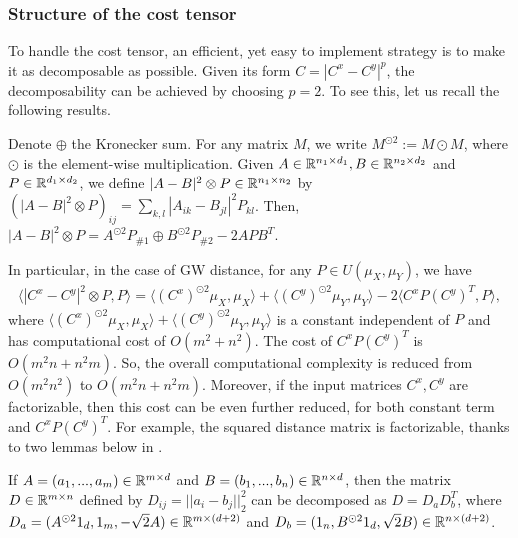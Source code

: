 \subsubsection{Structure of the cost tensor}
To handle the cost tensor, an efficient, yet easy to implement strategy is to make it
as decomposable as possible. Given its form $C = |C^x - C^y|^p$, the decomposability
can be achieved by choosing $p=2$. To see this, let us recall the following results.
\begin{lemma}
  \label{lemma_peyre16}
Denote $\oplus$ the Kronecker sum.
For any matrix $M$, we write $M^{\odot 2} := M \odot M$, where $\odot$
is the element-wise multiplication. Given $A \in \mathbb R^{n_1 \times d_1},
B \in \mathbb R^{n_2 \times d_2}$ and $P \in \mathbb R^{d_1 \times d_2}$, we define
$\vert A - B \vert^2 \otimes P \in \mathbb R^{n_1 \times n_2}$ by
$(\vert A - B \vert^2 \otimes P)_{ij} = \sum_{k,l } |A_{ik} - B_{jl}|^2 P_{kl}$.
Then, $\vert A - B \vert^2 \otimes P = A^{\odot 2} P_{\# 1} \oplus B^{\odot 2} P_{\# 2} - 2 A P B^T$.
\end{lemma}
In particular, in the case of GW distance, for any $P \in U(\mu_X, \mu_Y)$, we have
\begin{align}
  \label{eq:cost_tensor_full}
  \langle |C^x - C^y|^2 \otimes P, P \rangle
  = \langle (C^x)^{\odot 2} \mu_X, \mu_X \rangle + \langle (C^y)^{\odot 2} \mu_Y, \mu_Y \rangle
  - 2 \langle C^x P (C^y)^T, P \rangle,
\end{align}
where $\langle (C^x)^{\odot 2} \mu_X, \mu_X \rangle + \langle (C^y)^{\odot 2} \mu_Y, \mu_Y \rangle$
is a constant independent of $P$ and has computational cost of $O(m^2 + n^2)$.
The cost of $C^x P (C^y)^T$ is $O(m^2 n + n^2m)$.
So, the overall computational complexity is reduced from $O(m^2 n^2)$ to $O(m^2 n + n^2 m)$.
Moreover, if the input matrices $C^x, C^y$ are factorizable,
then this cost can be even further reduced, for both constant term and $C^x P (C^y)^T$.
For example, the squared distance matrix is factorizable,
thanks to two lemmas below in \citep{Meyer21b}.
\begin{lemma}
  If $A = (a_1,...,a_m) \in \mathbb R^{m \times d}$ and $B = (b_1,...,b_n) \in \mathbb R^{n \times d}$,
then the matrix $D \in \mathbb R^{m \times n}$ defined by
$D_{ij} = \vert\vert a_i - b_j \vert\vert_2^2$ can be decomposed as $D = D_a D_b^T$, where
$D_a = (A^{\odot 2} 1_d, 1_m, -\sqrt{2} A) \in \mathbb R^{m \times (d+2)}$ and
$D_b = (1_n, B^{\odot 2} 1_d, \sqrt{2} B) \in \mathbb R^{n \times (d+2)}$.
\end{lemma}
